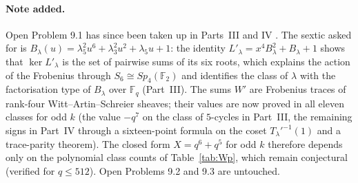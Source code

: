 \documentclass[11pt,a4paper]{amsart}
\theoremstyle{definition}
\newcommand{\F}{\mathbb{F}}
\begin{document}
\paragraph{Note added.}
Open Problem 9.1 has since been taken up in Parts~III and IV \cite{ChenIII,ChenIV}. The sextic asked for is
$B_\lambda(u)=\lambda_5^2u^6+\lambda_3^2u^2+\lambda_5u+1$: the identity $L'_\lambda=x^4B_\lambda^2+B_\lambda+1$
shows that $\ker L'_\lambda$ is the set of pairwise sums of its six roots, which explains the action of the
Frobenius through $S_6\cong Sp_4(\F_2)$ and identifies the class of $\lambda$ with the factorisation type of
$B_\lambda$ over $\F_q$ (Part~III). The sums $W'$ are Frobenius traces of rank-four Witt--Artin--Schreier
sheaves; their values are now proved in all eleven classes for odd $k$ (the value $-q^7$ on the class of
$5$-cycles in Part~III, the remaining signs in Part~IV through a sixteen-point formula on the coset
$T_\lambda'^{-1}(1)$ and a trace-parity theorem). The closed form $X=q^6+q^5$ for odd $k$ therefore depends
only on the polynomial class counts of Table~\ref{tab:Wp}, which remain conjectural (verified for
$q\le512$). Open Problems 9.2 and 9.3 are untouched.
\end{document}
